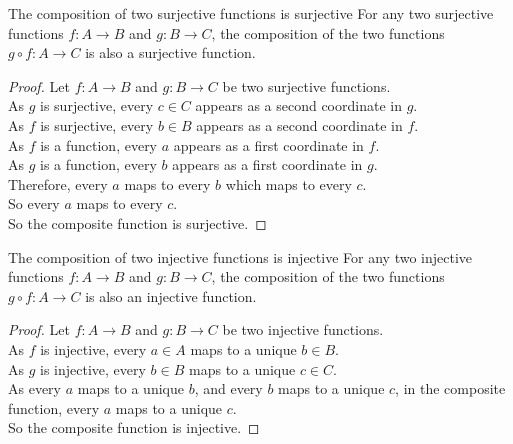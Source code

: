 \documentclass[../notes.tex]{subfiles}
\begin{document}
			\begin{theorem}{The composition of two surjective functions is surjective}
				For any two surjective functions $f: A \rightarrow B$ and $g: B \rightarrow C$, the composition of the two functions\\
					$g \circ f: A \rightarrow C$ is also a surjective function.
					\begin{proof}
						Let $f: A \rightarrow B$ and $g: B \rightarrow C$ be two surjective functions.\\
						As $g$ is surjective, every $c \in C$ appears as a second coordinate in $g$.\\
						As $f$ is surjective, every $b \in B$ appears as a second coordinate in $f$.\\
						As $f$ is a function, every $a$ appears as a first coordinate in $f$.\\
						As $g$ is a function, every $b$ appears as a first coordinate in $g$.\\
						Therefore, every $a$ maps to every $b$ which maps to every $c$.\\
						So every $a$ maps to every $c$.\\
						So the composite function is surjective.
					\end{proof}
			\end{theorem}
			\begin{theorem}{The composition of two injective functions is injective}
				For any two injective functions $f: A \rightarrow B$ and $g: B \rightarrow C$, the composition of the two functions\\
					$g \circ f: A \rightarrow C$ is also an injective function.
					\begin{proof}
						Let $f: A \rightarrow B$ and $g: B \rightarrow C$ be two injective functions.\\
						As $f$ is injective, every $a \in A$ maps to a unique $b \in B$.\\
						As $g$ is injective, every $b \in B$ maps to a unique $c \in C$.\\
						As every $a$ maps to a unique $b$, and every $b$ maps to a unique $c$, in the composite function, every $a$ maps to a unique $c$.\\
						So the composite function is injective.
					\end{proof}
			\end{theorem}
\end{document}
